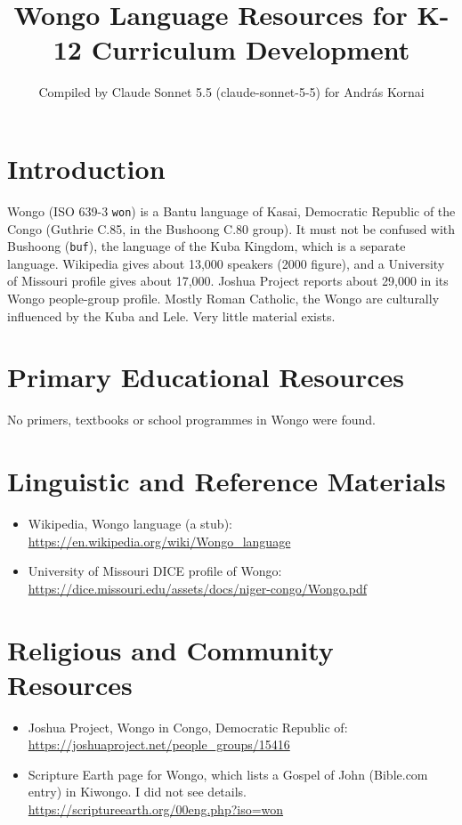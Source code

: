 \documentclass[12pt]{article}
\title{Wongo Language Resources for K-12 Curriculum Development}
\author{Compiled by Claude Sonnet 5.5 (claude-sonnet-5-5) for Andr\'as Kornai}
\date{}
\begin{document}
\maketitle

\section{Introduction}
Wongo (ISO 639-3 \texttt{won}) is a Bantu language of Kasai, Democratic Republic of the Congo (Guthrie C.85, in the Bushoong C.80 group). It must not be confused with Bushoong (\texttt{buf}), the language of the Kuba Kingdom, which is a separate language. Wikipedia gives about 13,000 speakers (2000 figure), and a University of Missouri profile gives about 17,000. Joshua Project reports about 29,000 in its Wongo people-group profile. Mostly Roman Catholic, the Wongo are culturally influenced by the Kuba and Lele. Very little material exists.

\section{Primary Educational Resources}
No primers, textbooks or school programmes in Wongo were found.

\section{Linguistic and Reference Materials}
\begin{itemize}
\item Wikipedia, Wongo language (a stub): \url{https://en.wikipedia.org/wiki/Wongo_language}
\item University of Missouri DICE profile of Wongo: \url{https://dice.missouri.edu/assets/docs/niger-congo/Wongo.pdf}
\end{itemize}

\section{Religious and Community Resources}
\begin{itemize}
\item Joshua Project, Wongo in Congo, Democratic Republic of: \url{https://joshuaproject.net/people_groups/15416}
\item Scripture Earth page for Wongo, which lists a Gospel of John (Bible.com entry) in Kiwongo. I did not see details. \url{https://scriptureearth.org/00eng.php?iso=won}
\end{itemize}
\end{document}
